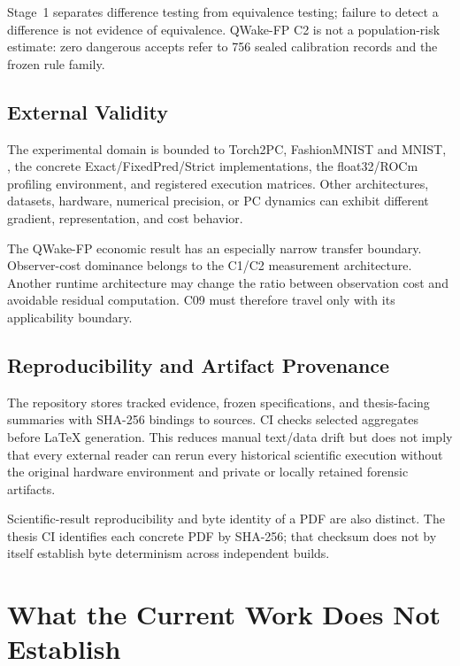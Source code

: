 Stage~1 separates difference testing from equivalence testing; failure to detect a
difference is not evidence of equivalence. QWake-FP C2 is not a population-risk
estimate: zero dangerous accepts refer to 756 sealed calibration records and the frozen
rule family.

\subsection{External Validity}

The experimental domain is bounded to Torch2PC, FashionMNIST and MNIST,
, the concrete Exact/FixedPred/Strict implementations, the
float32/ROCm profiling environment, and registered execution matrices. Other
architectures, datasets, hardware, numerical precision, or PC dynamics can exhibit
different gradient, representation, and cost behavior.

The QWake-FP economic result has an especially narrow transfer boundary. Observer-cost
dominance belongs to the C1/C2 measurement architecture. Another runtime architecture
may change the ratio between observation cost and avoidable residual computation. C09
must therefore travel only with its applicability boundary.

\subsection{Reproducibility and Artifact Provenance}

The repository stores tracked evidence, frozen specifications, and thesis-facing
summaries with SHA-256 bindings to sources. CI checks selected aggregates before LaTeX
generation. This reduces manual text/data drift but does not imply that every external
reader can rerun every historical scientific execution without the original hardware
environment and private or locally retained forensic artifacts.

Scientific-result reproducibility and byte identity of a PDF are also distinct. The
thesis CI identifies each concrete PDF by SHA-256; that checksum does not by itself
establish byte determinism across independent builds.

\section{What the Current Work Does Not Establish}
\label{sec:discussion-nonclaims-en}

